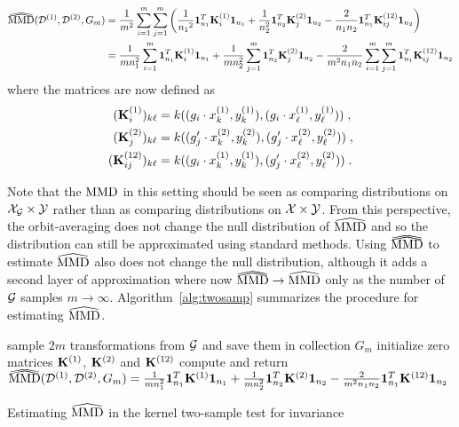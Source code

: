 \begin{align*}
\dhatMMD(\calD^{(1)},\calD^{(2)},G_m) &= \frac{1}{m^2}\sum_{i=1}^m\sum_{j=1}^m \left(\frac{1}{{n_1}^2}\onevec_{n_1}^T\bfK_i^{(1)}\onevec_{n_1} + \frac{1}{n_2^2}\onevec_{n_2}^T\bfK_j^{(2)}\onevec_{n_2} - \frac{2}{n_1n_2}\onevec_{n_1}^T\bfK_{ij}^{(12)}\onevec_{n_2}\right) \\
&= \frac{1}{mn_1^2}\sum_{i=1}^m\onevec_{n_1}^T\bfK_i^{(1)}\onevec_{n_1} + \frac{1}{mn_2^2}\sum_{j=1}^m\onevec_{n_2}^T\bfK_j^{(2)}\onevec_{n_2} - \frac{2}{m^2n_1n_2}\sum_{i=1}^m\sum_{j=1}^m\onevec_{n_1}^T\bfK_{ij}^{(12)}\onevec_{n_2}
\end{align*}
where the matrices are now defined as
\begin{align*}
(\mathbf{K}_i^{(1)})_{k\ell} &= k((g_i\cdot x^{(1)}_k,y^{(1)}_k),(g_i\cdot x^{(1)}_\ell,y^{(1)}_\ell)) \;, \\
(\mathbf{K}_j^{(2)})_{k\ell} &= k((g_j'\cdot x^{(2)}_k, y^{(2)}_k),(g_j'\cdot x^{(2)}_\ell, y^{(2)}_\ell)) \;, \\
(\mathbf{K}_{ij}^{(12)})_{k\ell} &= k((g_i\cdot x^{(1)}_k, y^{(1)}_k),(g_j'\cdot x^{(2)}_\ell, y^{(2)}_\ell)) \;. 
\end{align*}

Note that the $\mathrm{MMD}$ in this setting should be seen as comparing distributions on $\mathcal{X}_{\mathcal{G}}\times\mathcal{Y}$ rather than as comparing distributions on $\mathcal{X}\times\mathcal{Y}$. From this perspective, the orbit-averaging does not change the null distribution of $\widehat{\mathrm{MMD}}$ and so the distribution can still be approximated using standard methods. Using $\dhatMMD$ to estimate $\widehat{\mathrm{MMD}}$ also does not change the null distribution, although it adds a second layer of approximation where now $\dhatMMD\rightarrow\hatMMD$ only as the number of $\mathcal{G}$ samples $m\rightarrow\infty$. Algorithm~\ref{alg:twosamp} summarizes the procedure for estimating $\widehat{\mathrm{MMD}}$.
\\

\begin{algorithm}[H]
\SetAlgoLined
{}
\BlankLine
sample $2m$ transformations from $\mathcal{G}$ and save them in collection $G_m$\;
initialize zero matrices $\mathbf{K}^{(1)}$, $\mathbf{K}^{(2)}$ and $\mathbf{K}^{(12)}$\;
compute and return $\dhatMMD(\calD^{(1)},\calD^{(2)}, G_m)=\frac{1}{mn_1^2}\onevec_{n_1}^T\bfK^{(1)}\onevec_{n_1} + \frac{1}{mn_2^2}\onevec_{n_2}^T\bfK^{(2)}\onevec_{n_2} - \frac{2}{m^2n_1n_2}\onevec_{n_1}^T\bfK^{(12)}\onevec_{n_2}$\;
\caption{Estimating $\widehat{\mathrm{MMD}}$ in the kernel two-sample test for invariance}
\label{alg:twosamp}
\end{algorithm}
\vspace{1em}

